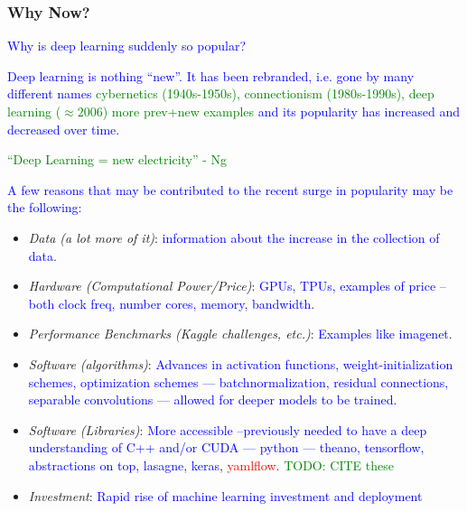 \subsubsection{Why Now?}

\textcolor{blue}{Why is deep learning suddenly so popular?}

\textcolor{blue}{Deep learning is nothing ``new''. It has been rebranded, i.e. gone by many different names \textcolor{green}{cybernetics (1940s-1950s), connectionism (1980s-1990s), deep learning ($\approx 2006$) more prev+new examples} and its popularity has increased and decreased over time.}

\textcolor{green}{``Deep Learning = new electricity'' - Ng}

\textcolor{blue}{A few reasons that may be contributed to the recent surge in popularity may be the following:}

\begin{itemize}
	
	\item \textit{Data (a lot more of it)}: \textcolor{blue}{information about the increase in the collection of data}.
	
	\item \textit{Hardware (Computational Power/Price)}: \textcolor{blue}{GPUs, TPUs, examples of price -- both clock freq, number cores, memory, bandwidth}.
	
	\item \textit{Performance Benchmarks (Kaggle challenges, etc.)}: \textcolor{blue}{Examples like imagenet}.
	
	\item \textit{Software (algorithms)}: \textcolor{blue}{Advances in activation functions, weight-initialization schemes, optimization schemes --- batchnormalization, residual connections, separable convolutions --- allowed for deeper models to be trained.}
	
	\item \textit{Software (Libraries)}: \textcolor{blue}{More accessible --previously needed to have a deep understanding of C++ and/or CUDA --- python --- theano, tensorflow, abstractions on top, lasagne, keras, \textcolor{red}{yamlflow}. \textcolor{green}{TODO: CITE these} }
	
	\item \textit{Investment}: \textcolor{blue}{Rapid rise of machine learning investment and deployment}
	
\end{itemize}

